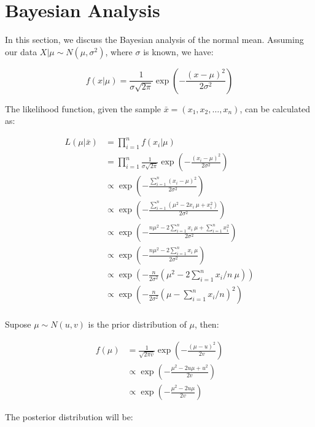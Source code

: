 \section{Bayesian Analysis}

In this section, we discuss the Bayesian analysis of the normal mean.
Assuming our data $X | \mu \sim N(\mu, \sigma^2)$, where $\sigma$ is known, we have:

\[ f(x | \mu) = \frac{1}{\sigma \sqrt{2\pi}} \exp\left(-\frac{(x - \mu)^2}{2\sigma^2}\right) \]

The likelihood function, given the sample $\bar{x} = (x_1, x_2, \dots, x_n)$, can be calculated as:

\begin{align*}
  L(\mu | \bar{x}) &= \prod_{i = 1}^{n} f(x_i | \mu) \\
  &= \prod_{i = 1}^{n} \frac{1}{\sigma \sqrt{2\pi}} \exp\left(-\frac{(x_i - \mu)^2}{2\sigma^2}\right) \\
  &\propto \exp\left(-\frac{\sum_{i = 1}^{n} (x_i - \mu)^2}{2\sigma^2}\right) \\
  &\propto \exp\left(-\frac{\sum_{i = 1}^{n} (\mu^2 - 2x_i ~ \mu + x_i^2)}{2\sigma^2}\right) \\
  &\propto \exp\left(-\frac{n \mu^2 - 2\sum_{i = 1}^{n} x_i ~ \mu + \sum_{i = 1}^{n} x_i^2}{2\sigma^2}\right) \\
  &\propto \exp\left(-\frac{n \mu^2 - 2\sum_{i = 1}^{n} x_i ~ \mu}{2\sigma^2}\right) \\
  &\propto \exp\left(-\frac{n}{2\sigma^2} \left(\mu^2 - 2\sum_{i = 1}^{n} x_i / n ~ \mu\right)\right) \\
  &\propto \exp\left(-\frac{n}{2\sigma^2} \left(\mu - \sum_{i = 1}^{n} x_i / n\right)^2\right) \\
\end{align*}

Supose $\mu \sim N(u, v)$ is the prior distribution of $\mu$, then:

\begin{align*}
  f(\mu) &= \frac{1}{\sqrt{2\pi v}} \exp\left(-\frac{(\mu - u)^2}{2v}\right) \\
  &\propto \exp\left(-\frac{\mu^2 - 2u \mu + u^2}{2v}\right) \\
  &\propto \exp\left(-\frac{\mu^2 - 2u \mu}{2v}\right)
\end{align*}

The posterior distribution will be:

